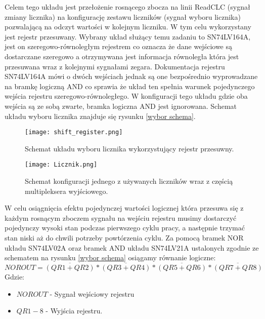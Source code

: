 Celem tego układu jest przełożenie rosnącego zbocza na linii ReadCLC (sygnał zmiany licznika) na konfigurację zestawu liczników (sygnał wyboru licznika) pozwalającą na odczyt wartości w kolejnym liczniku. W tym celu wykorzystany jest rejestr przesuwany. 
Wybrany układ służący temu zadaniu to SN74LV164A\cite{shift doc}, jest on szeregowo-równoległym rejestrem co oznacza że dane wejściowe są dostarczane szeregowo a otrzymywana jest informacja równoległa która jest przesuwana wraz z kolejnymi sygnałami zegara. Dokumentacja rejestru SN74LV164A mówi o dwóch wejściach jednak są one bezpośrednio wyprowadzane na bramkę logiczną AND co sprawia że układ ten spełnia warunek pojedynczego wejścia rejestru szeregowo-równoległego. W konfiguracji tego układu gdzie oba wejścia są ze sobą zwarte, bramka logiczna AND jest ignorowana.
Schemat układu wyboru licznika znajduje się rysunku \ref{wybor schema}. 

\begin{figure}
        \begin{multicols}{2}
                \texttt{[image: shift\_register.png]}
                \caption{Schemat układu wyboru licznika wykorzystujący rejestr przesuwny.}
                \label{wybor schema}
                \par
                \hfill
                \texttt{[image: Licznik.png]}
                \caption{Schemat konfiguracji jednego z używanych liczników wraz z częścią multipleksera wyjściowego.}
                \label{licznik}
                \par
                \hfill
        \end{multicols} 
\end{figure}

W celu osiągnięcia efektu pojedynczej wartości logicznej która przesuwa się z każdym rosnącym zboczem sygnału na wejściu rejestru musimy dostarczyć pojedynczy wysoki stan podczas pierwszego cyklu pracy, a następnie trzymać stan niski aż do chwili potrzeby powtórzenia cyklu. 
Za pomocą bramek NOR układu SN74LV02A oraz bramek AND układu SN74LV21A ustalonych zgodnie ze schematem na rysunku \ref{wybor schema} osiągamy równanie logiczne:
\begin{equation}
        NOROUT = \overline{(QR1+QR2)} * \overline{(QR3+QR4)} * \overline{(QR5+QR6)} * \overline{(QR7+QR8)}
\end{equation}
Gdzie:
\begin{itemize}
        \item $NOROUT$ - Sygnał wejściowy rejestru 
        \item $QR1-8$ - Wyjścia rejestru. 
\end{itemize}

